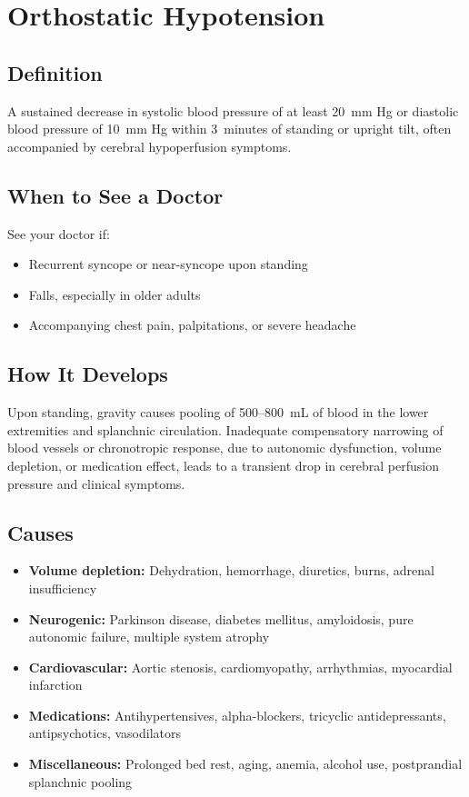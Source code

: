 \chapter{Orthostatic Hypotension}

\section*{Definition}
A sustained decrease in systolic blood pressure of at least 20~mm Hg or diastolic blood pressure of 10~mm Hg within 3~minutes of standing or upright tilt, often accompanied by cerebral hypoperfusion symptoms.

\section*{When to See a Doctor}
See your doctor if:
\begin{itemize}
  \item Recurrent syncope or near-syncope upon standing
  \item Falls, especially in older adults
  \item Accompanying chest pain, palpitations, or severe headache
\end{itemize}

\section*{How It Develops}
Upon standing, gravity causes pooling of 500--800~mL of blood in the lower extremities and splanchnic circulation. Inadequate compensatory narrowing of blood vessels or chronotropic response, due to autonomic dysfunction, volume depletion, or medication effect, leads to a transient drop in cerebral perfusion pressure and clinical symptoms.

\section*{Causes}
\begin{itemize}
  \item \textbf{Volume depletion:} Dehydration, hemorrhage, diuretics, burns, adrenal insufficiency
  \item \textbf{Neurogenic:} Parkinson disease, diabetes mellitus, amyloidosis, pure autonomic failure, multiple system atrophy
  \item \textbf{Cardiovascular:} Aortic stenosis, cardiomyopathy, arrhythmias, myocardial infarction
  \item \textbf{Medications:} Antihypertensives, alpha-blockers, tricyclic antidepressants, antipsychotics, vasodilators
  \item \textbf{Miscellaneous:} Prolonged bed rest, aging, anemia, alcohol use, postprandial splanchnic pooling
\end{itemize}


